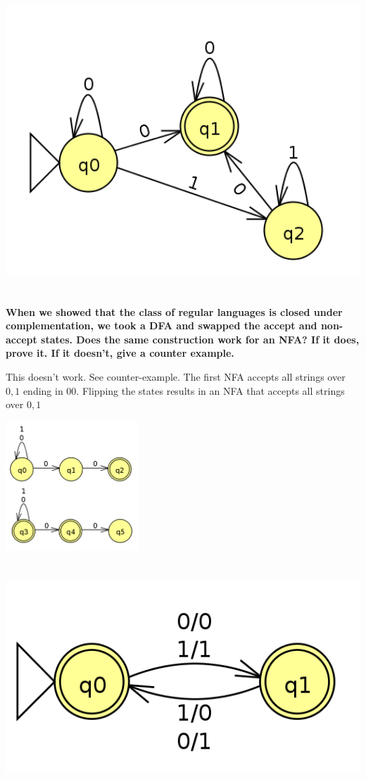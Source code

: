 \documentclass[a4paper,12pt]{article}
\begin{document}
\section{}
\includegraphics[width=15cm]{q4}
\section{}
\textbf{When we showed that the class of regular languages is closed under complementation, we took
a DFA and swapped the accept and non-accept states. Does the same construction work for an
NFA? If it does, prove it. If it doesn't, give a counter example.}

This doesn't work.
See counter-example.
The first NFA accepts all strings over $0,1$ ending in $00$.
Flipping the states results in an NFA that accepts all strings over $0,1$

\includegraphics[width=5cm]{q5}
\section{}
\includegraphics[width=15cm]{q6}
\end{document}
